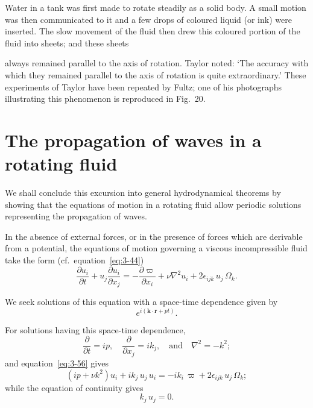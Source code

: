 Water in a tank was first made to rotate steadily as a solid body. A small motion was then communicated to it and a few drops of coloured liquid (or ink) were inserted. The slow movement of the fluid then drew this coloured portion of the fluid into sheets; and these sheets


\noindent always remained parallel to the axis of rotation. Taylor noted: `The accuracy with which they remained parallel to the axis of rotation is quite extraordinary.' These experiments of Taylor have been repeated by Fultz; one of his photographs illustrating this phenomenon is reproduced in Fig.~20.

\section{The propagation of waves in a rotating fluid}\label{sec:3-23}
We shall conclude this excursion into general hydrodynamical theorems by showing that the equations of motion in a rotating fluid allow periodic solutions representing the propagation of waves.

In the absence of external forces, or in the presence of forces which are derivable from a potential, the equations of motion governing a viscous incompressible fluid take the form (cf.\ equation~\eqref{eq:3-44})
\begin{equation}\label{eq:3-56}
\frac{\partial u_i}{\partial t} + u_j\frac{\partial u_i}{\partial x_j} = -\frac{\partial\varpi}{\partial x_i} + \nu\nabla^2 u_i + 2\epsilon_{ijk}\, u_j\,\Omega_k.
\end{equation}

We seek solutions of this equation with a space-time dependence given by
\begin{equation}\label{eq:3-57}
e^{i(\mathbf{k}\cdot\mathbf{r}+pt)}.
\end{equation}

For solutions having this space-time dependence,
\begin{equation}\label{eq:3-58}
\frac{\partial}{\partial t} = ip, \quad \frac{\partial}{\partial x_j} = ik_j, \quad \text{and} \quad \nabla^2 = -k^2;
\end{equation}
and equation~\eqref{eq:3-56} gives
\begin{equation}\label{eq:3-59}
(ip + \nu k^2)u_i + ik_j\, u_j\, u_i = -ik_i\,\varpi + 2\epsilon_{ijk}\, u_j\,\Omega_k;
\end{equation}
while the equation of continuity gives
\begin{equation}\label{eq:3-60}
k_j\, u_j = 0.
\end{equation}

